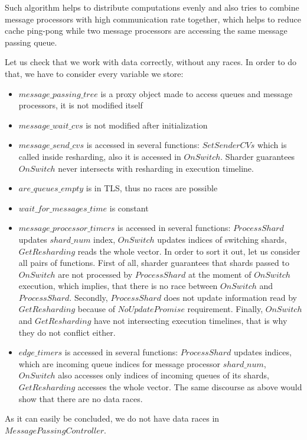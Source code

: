 \documentclass{article}
\begin{document}
Such algorithm helps to distribute computations evenly and also tries to combine message processors with high communication rate together, which helps to reduce cache ping-pong while two message processors are accessing the same message passing queue.

Let us check that we work with data correctly, without any races. In order to do that, we have to consider every variable we store:
\begin{itemize}
	\item $message\_passing\_tree$ is a proxy object made to access queues and message processors, it is not modified itself
	\item $message\_wait\_cvs$ is not modified after initialization
	\item $message\_send\_cvs$ is accessed in several functions: $SetSenderCVs$ which is called inside resharding, also it is accessed in $OnSwitch$. Sharder guarantees $OnSwitch$ never intersects with resharding in execution timeline.
	\item $are\_queues\_empty$ is in TLS, thus no races are possible
	\item $wait\_for\_messages\_time$ is constant
	\item $message\_processor\_timers$ is accessed in several functions: $ProcessShard$ updates $shard\_num$ index, $OnSwitch$ updates indices of switching shards, $GetResharding$ reads the whole vector. In order to sort it out, let us consider all pairs of functions. First of all, sharder guarantees that shards passed to $OnSwitch$ are not processed by $ProcessShard$ at the moment of $OnSwitch$ execution, which implies, that there is no race between $OnSwitch$ and $ProcessShard$. Secondly, $ProcessShard$ does not update information read by $GetResharding$ because of $NoUpdatePromise$ requirement. Finally, $OnSwitch$ and $GetResharding$ have not intersecting execution timelines, that is why they do not conflict either.
	\item $edge\_timers$ is accessed in several functions: $ProcessShard$ updates indices, which are incoming queue indices for message processor $shard\_num$, $OnSwitch$ also accesses only indices of incoming queues of its shards, $GetResharding$ accesses the whole vector. The same discourse as above would show that there are no data races.
\end{itemize}

As it can easily be concluded, we do not have data races in $MessagePassingController$.
\end{document}
